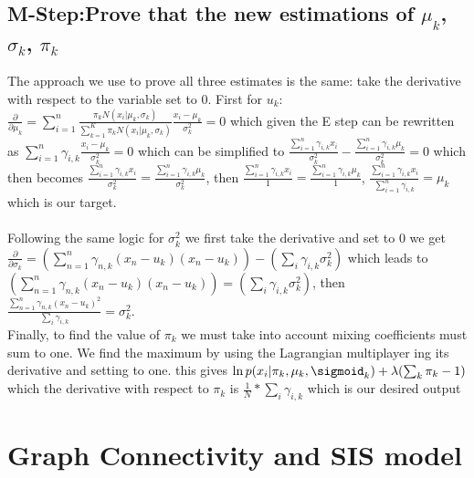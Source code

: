 \documentclass[11pt]{article}
\begin{document}
\subsection{M-Step:Prove that the new estimations of $\mu_k$, $\sigma_k$, $\pi_k$}
The approach we use to prove all three estimates is the same: take the derivative with respect to the variable set to 0. 
First for $u_k$: $\frac{\partial}{\partial \mu_k}= \sum_{i=1}^n \frac{\pi_k N(x_i| \mu_k, \sigma_k)}{\sum_{k=1}^K \pi_k N(x_i| \mu_k, \sigma_k)} \frac{x_i - \mu_k}{\sigma_k^2} = 0$ which given the E step can be rewritten as $\sum_{i=1}^n \gamma_{i,k}\frac{x_i - \mu_k}{\sigma_k^2} = 0 $ which can be simplified to $\frac{\sum_{i=1}^n \gamma_{i,k}x_i}{\sigma_k^2}  - \frac{\sum_{i=1}^n \gamma_{i,k}\mu_k}{\sigma_k^2} = 0 $ which then becomes $\frac{\sum_{i=1}^n \gamma_{i,k}x_i}{\sigma_k^2}  = \frac{\sum_{i=1}^n \gamma_{i,k}\mu_k}{\sigma_k^2}$, then $\frac{\sum_{i=1}^n \gamma_{i,k}x_i}{1}  = \frac{\sum_{i=1}^n \gamma_{i,k}\mu_k}{1}$, $\frac{\sum_{i=1}^n \gamma_{i,k}x_i}{\sum_{i=1}^n \gamma_{i,k}}  = \mu_k$ which is our target. \\\\
Following the same logic for $\sigma_k^2$ we first take the derivative and set to 0 we get $\frac{\partial }{\partial \sigma_k} =  (\sum_{n=1}^n \gamma_{n,k}(x_n-u_k)(x_n-u_k)) - (\sum_i \gamma_{i,k} \sigma_k^2)$ which leads to $(\sum_{n=1}^n \gamma_{n,k}(x_n-u_k)(x_n-u_k)) = (\sum_i \gamma_{i,k} \sigma_k^2)$, then $\frac{\sum_{n=1}^n \gamma_{n,k}(x_n-u_k)^2}{\sum_i \gamma_{i,k}} =  \sigma_k^2$. \\
Finally, to find the value of $\pi_k$ we must take into account mixing coefficients must sum to one. We find the maximum by using the Lagrangian multiplayer ing its derivative and setting to one. this gives $\ln p(x_i| \pi_k, \mu_k, \sigmoid_k) + \lambda (\sum_k \pi_k -1)$ which the derivative with respect to $\pi_k$ is $\frac{1}{N}*\sum_i \gamma_{i,k}$ which is our desired output
\section{Graph Connectivity and SIS model}
\end{document}
